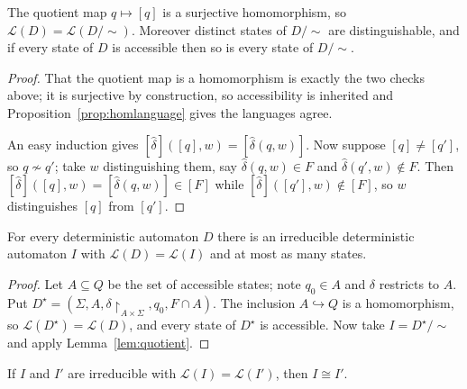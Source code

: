 \documentclass[a4paper]{scrartcl}
\newcommand{\lang}{\mathcal{L}}
\begin{document}
\begin{lemma}\label{lem:quotient}
	The quotient map $q \mapsto [q]$ is a surjective homomorphism, so $\lang(D) = \lang(D/{\sim})$. Moreover distinct states of $D/{\sim}$ are distinguishable, and if every state of $D$ is accessible then so is every state of $D/{\sim}$.
\end{lemma}

\begin{proof}
	That the quotient map is a homomorphism is exactly the two checks above; it is surjective by construction, so accessibility is inherited and Proposition~\ref{prop:homlanguage} gives the languages agree.

	An easy induction gives $[\hat\delta]([q],w) = [\hat\delta(q,w)]$. Now suppose $[q] \neq [q']$, so $q \not\sim q'$; take $w$ distinguishing them, say $\hat\delta(q,w) \in F$ and $\hat\delta(q',w) \notin F$. Then $[\hat\delta]([q],w) = [\hat\delta(q,w)] \in [F]$ while $[\hat\delta]([q'],w) \notin [F]$, so $w$ distinguishes $[q]$ from $[q']$.
\end{proof}

\begin{theorem}\label{thm:irreducibleexists}
	For every deterministic automaton $D$ there is an irreducible deterministic automaton $I$ with $\lang(D) = \lang(I)$ and at most as many states.
\end{theorem}

\begin{proof}
	Let $A \subseteq Q$ be the set of accessible states; note $q_0 \in A$ and $\delta$ restricts to $A$. Put $D^\star = (\Sigma, A, \delta\restriction_{A\times\Sigma}, q_0, F \cap A)$. The inclusion $A \hookrightarrow Q$ is a homomorphism, so $\lang(D^\star) = \lang(D)$, and every state of $D^\star$ is accessible. Now take $I = D^\star/{\sim}$ and apply Lemma~\ref{lem:quotient}.
\end{proof}

\begin{theorem}\label{thm:irreducibleunique}
	If $I$ and $I'$ are irreducible with $\lang(I) = \lang(I')$, then $I \cong I'$.
\end{theorem}
\end{document}
